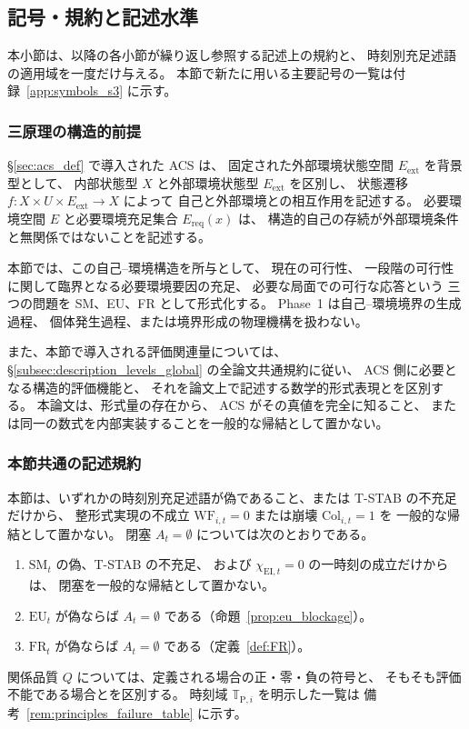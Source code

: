 \subsection{記号・規約と記述水準}
\label{subsec:s3_setup}

本小節は、以降の各小節が繰り返し参照する記述上の規約と、
時刻別充足述語の適用域を一度だけ与える。
本節で新たに用いる主要記号の一覧は付録~\ref{app:symbols_s3} に示す。

\subsubsection*{三原理の構造的前提}

\S\ref{sec:acs_def} で導入された ACS は、
固定された外部環境状態空間 $E_{\mathrm{ext}}$ を背景型として、
内部状態型 $X$ と外部環境状態型 $E_{\mathrm{ext}}$ を区別し、
状態遷移 $f:X\times U\times E_{\mathrm{ext}}\to X$ によって
自己と外部環境との相互作用を記述する。
必要環境空間 $E$ と必要環境充足集合 $E_{\mathrm{req}}(x)$ は、
構造的自己の存続が外部環境条件と無関係ではないことを記述する。

本節では、この自己--環境構造を所与として、
現在の可行性、
一段階の可行性に関して臨界となる必要環境要因の充足、
必要な局面での可行な応答という
三つの問題を SM、EU、FR として形式化する。
Phase~1 は自己--環境境界の生成過程、
個体発生過程、または境界形成の物理機構を扱わない。

また、本節で導入される評価関連量については、
\S\ref{subsec:description_levels_global} の全論文共通規約に従い、
ACS 側に必要となる構造的評価機能と、
それを論文上で記述する数学的形式表現とを区別する。
本論文は、形式量の存在から、
ACS がその真値を完全に知ること、
または同一の数式を内部実装することを一般的な帰結として置かない。

\subsubsection*{本節共通の記述規約}

\begin{remark}
\label{rem:conv_nonimplication}
本節は、いずれかの時刻別充足述語が偽であること、または T-STAB の不充足だけから、
整形式実現の不成立 $\mathrm{WF}_{i,t}=0$ または崩壊 $\mathrm{Col}_{i,t}=1$ を
一般的な帰結として置かない。
閉塞 $A_t=\emptyset$ については次のとおりである。
\begin{enumerate}
  \item $\mathrm{SM}_t$ の偽、T-STAB の不充足、
  および $\chi_{\mathrm{EI},t}=0$ の一時刻の成立だけからは、
  閉塞を一般的な帰結として置かない。
  \item $\mathrm{EU}_t$ が偽ならば $A_t=\emptyset$ である（命題~\ref{prop:eu_blockage}）。
  \item $\mathrm{FR}_t$ が偽ならば $A_t=\emptyset$ である（定義~\ref{def:FR}）。
\end{enumerate}
関係品質 $Q$ については、定義される場合の正・零・負の符号と、
そもそも評価不能である場合とを区別する。
時刻域 $\mathbb{T}_{\mathrm{P},i}$ を明示した一覧は
備考~\ref{rem:principles_failure_table} に示す。
\end{remark}

